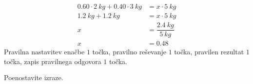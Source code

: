 \documentclass[addpoints]{exam}
\begin{document}
\begin{questions}
        \begin{solution}[5cm]
            \begin{align*}
                0.60 \cdot 2~kg + 0.40\cdot 3~kg &= x \cdot 5~kg \\
                                 1.2~kg+1.2~kg &= x\cdot 5~kg \\
                                            x &= \dfrac{2.4~kg}{5~kg} \\
                                            x &= 0.48
            \end{align*}
            Pravilna nastavitev enačbe $1$ točka, pravilno reševanje $1$ točka, pravilen rezultat $1$ točka, zapis pravilnega odgovora $1$ točka.
        \end{solution}





    \newpage


        \question
        Poenostavite izraze.
\end{questions}
\end{document}
